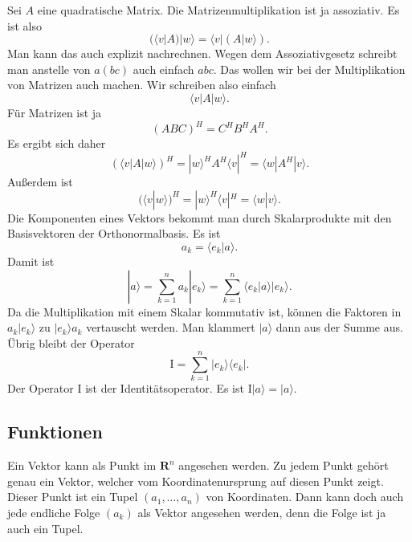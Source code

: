 \documentclass[a4paper,10pt,fleqn,twocolumn,twoside]{article}
\numberwithin{equation}{section}
\begin{document}
Sei $A$ eine quadratische Matrix. Die Matrizenmultiplikation ist
ja assoziativ. Es ist also
\begin{equation}
(\langle v|A)|w\rangle = \langle v|(A|w\rangle).
\end{equation}
Man kann das auch explizit nachrechnen. Wegen dem Assoziativgesetz
schreibt man anstelle von $a(bc)$ auch einfach $abc$. Das wollen
wir bei der Multiplikation von Matrizen auch machen. Wir schreiben also einfach
\begin{equation}
\langle v|A|w\rangle.
\end{equation}
Für Matrizen ist ja
\begin{equation}
(ABC)^H = C^HB^HA^H.
\end{equation}
Es ergibt sich daher
\begin{equation}
(\langle v|A|w\rangle)^H = |w\rangle^H A^H \langle v|^H
= \langle w|A^H|v\rangle.
\end{equation}
Außerdem ist
\begin{equation}
(\langle v|w\rangle)^H = |w\rangle^H\langle v|^H
= \langle w|v\rangle.
\end{equation}
Die Komponenten eines Vektors bekommt man durch Skalarprodukte mit
den Basisvektoren der Orthonormalbasis. Es ist
\begin{equation}
a_k = \langle e_k|a\rangle.
\end{equation}
Damit ist
\begin{equation}
|a\rangle = \sum_{k=1}^n a_k |e_k\rangle
= \sum_{k=1}^n \langle e_k|a\rangle |e_k\rangle.
\end{equation}
Da die Multiplikation mit einem Skalar kommutativ ist, können die
Faktoren in $a_k|e_k\rangle$ zu $|e_k\rangle a_k$ vertauscht
werden. Man klammert $|a\rangle$ dann aus der Summe aus.
Übrig bleibt der Operator
\begin{equation}
\mathrm I = \sum_{k=1}^n |e_k\rangle\langle e_k|.
\end{equation}
Der Operator $\mathrm I$ ist der Identitätsoperator.
Es ist $\mathrm I|a\rangle = |a\rangle$.


\subsection{Funktionen}

Ein Vektor kann als Punkt im $\mathbf R^n$ angesehen werden.
Zu jedem Punkt gehört genau ein Vektor, welcher vom
Koordinatenursprung auf diesen Punkt zeigt. Dieser Punkt ist
ein Tupel $(a_1,\ldots,a_n)$ von Koordinaten. Dann kann doch auch
jede endliche Folge $(a_k)$ als Vektor angesehen werden, denn die
Folge ist ja auch ein Tupel.
\end{document}
